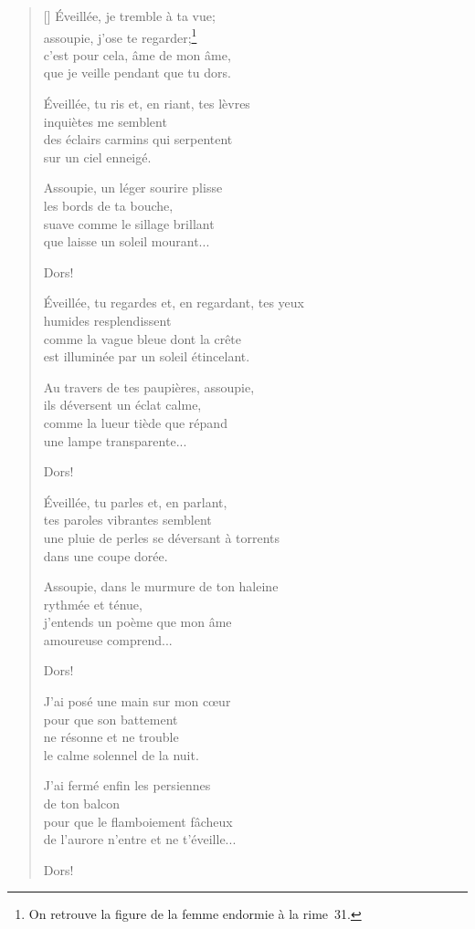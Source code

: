 \documentclass[a4paper,12pt]{book}
\begin{document}
\begin{verse}[\versewidth]
  Éveillée, je tremble à ta vue; \\
  assoupie, j'ose te regarder;\footnote{On retrouve la figure de la femme endormie à la rime~31.} \\
  c'est pour cela, âme de mon âme, \\
  que je veille pendant que tu dors.

  Éveillée, tu ris et, en riant, tes lèvres \\
  inquiètes me semblent \\
  des éclairs carmins qui serpentent \\
  sur un ciel enneigé.

  Assoupie, un léger sourire plisse \\
  les bords de ta bouche, \\
  suave comme le sillage brillant \\
  que laisse un soleil mourant...

  Dors!

  Éveillée, tu regardes et, en regardant, tes yeux \\
  humides resplendissent \\
  comme la vague bleue dont la crête \\
  est illuminée par un soleil étincelant.

  Au travers de tes paupières, assoupie, \\
  ils déversent un éclat calme, \\
  comme la lueur tiède que répand \\
  une lampe transparente...

  Dors!

  Éveillée, tu parles et, en parlant, \\
  tes paroles vibrantes semblent \\
  une pluie de perles se déversant à torrents \\
  dans une coupe dorée.

  Assoupie, dans le murmure de ton haleine \\
  rythmée et ténue, \\
  j'entends un poème que mon âme \\
  amoureuse comprend...

  Dors!

  J'ai posé une main sur mon cœur \\
  pour que son battement \\
  ne résonne et ne trouble \\
  le calme solennel de la nuit.

  J'ai fermé enfin les persiennes \\
  de ton balcon \\
  pour que le flamboiement fâcheux \\
  de l'aurore n'entre et ne t'éveille...

  Dors!
\end{verse}
\end{document}
